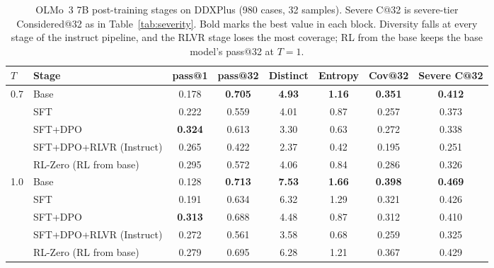\documentclass[11pt]{article}
\begin{document}
\begin{table}[t]
\centering\small
\begin{adjustbox}{max width=\linewidth}
\begin{tabular}{llcccccc}
\toprule
$T$ & Stage & pass@1 & pass@32 & Distinct & Entropy & Cov@32 & Severe C@32 \\
\midrule
0.7 & Base & 0.178 & \textbf{0.705} & \textbf{4.93} & \textbf{1.16} & \textbf{0.351} & \textbf{0.412} \\
 & SFT & 0.222 & 0.559 & 4.01 & 0.87 & 0.257 & 0.373 \\
 & SFT+DPO & \textbf{0.324} & 0.613 & 3.30 & 0.63 & 0.272 & 0.338 \\
 & SFT+DPO+RLVR (Instruct) & 0.265 & 0.422 & 2.37 & 0.42 & 0.195 & 0.251 \\
 & RL-Zero (RL from base) & 0.295 & 0.572 & 4.06 & 0.84 & 0.286 & 0.326 \\
\midrule
1.0 & Base & 0.128 & \textbf{0.713} & \textbf{7.53} & \textbf{1.66} & \textbf{0.398} & \textbf{0.469} \\
 & SFT & 0.191 & 0.634 & 6.32 & 1.29 & 0.321 & 0.426 \\
 & SFT+DPO & \textbf{0.313} & 0.688 & 4.48 & 0.87 & 0.312 & 0.410 \\
 & SFT+DPO+RLVR (Instruct) & 0.272 & 0.561 & 3.58 & 0.68 & 0.259 & 0.325 \\
 & RL-Zero (RL from base) & 0.279 & 0.695 & 6.28 & 1.21 & 0.367 & 0.429 \\
\bottomrule
\end{tabular}
\end{adjustbox}
\caption{OLMo~3 7B post-training stages on DDXPlus (980 cases, 32 samples). Severe C@32 is severe-tier Considered@32 as in Table~\ref{tab:severity}. Bold marks the best value in each block. Diversity falls at every stage of the instruct pipeline, and the RLVR stage loses the most coverage; RL from the base keeps the base model's pass@32 at $T{=}1$.}
\label{tab:stages}
\end{table}
\end{document}
